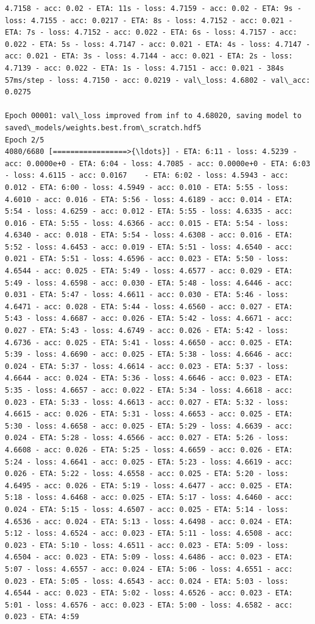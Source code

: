 \documentclass[11pt]{article}
\begin{document}
\begin{Verbatim}[commandchars=\\\{\}]
4.7158 - acc: 0.02 - ETA: 11s - loss: 4.7159 - acc: 0.02 - ETA: 9s - loss: 4.7155 - acc: 0.0217 - ETA: 8s - loss: 4.7152 - acc: 0.021 - ETA: 7s - loss: 4.7152 - acc: 0.022 - ETA: 6s - loss: 4.7157 - acc: 0.022 - ETA: 5s - loss: 4.7147 - acc: 0.021 - ETA: 4s - loss: 4.7147 - acc: 0.021 - ETA: 3s - loss: 4.7144 - acc: 0.021 - ETA: 2s - loss: 4.7139 - acc: 0.022 - ETA: 1s - loss: 4.7151 - acc: 0.021 - 384s 57ms/step - loss: 4.7150 - acc: 0.0219 - val\_loss: 4.6802 - val\_acc: 0.0275

Epoch 00001: val\_loss improved from inf to 4.68020, saving model to saved\_models/weights.best.from\_scratch.hdf5
Epoch 2/5
4080/6680 [=================>{\ldots}] - ETA: 6:11 - loss: 4.5239 - acc: 0.0000e+0 - ETA: 6:04 - loss: 4.7085 - acc: 0.0000e+0 - ETA: 6:03 - loss: 4.6115 - acc: 0.0167    - ETA: 6:02 - loss: 4.5943 - acc: 0.012 - ETA: 6:00 - loss: 4.5949 - acc: 0.010 - ETA: 5:55 - loss: 4.6010 - acc: 0.016 - ETA: 5:56 - loss: 4.6189 - acc: 0.014 - ETA: 5:54 - loss: 4.6259 - acc: 0.012 - ETA: 5:55 - loss: 4.6335 - acc: 0.016 - ETA: 5:55 - loss: 4.6366 - acc: 0.015 - ETA: 5:54 - loss: 4.6340 - acc: 0.018 - ETA: 5:54 - loss: 4.6308 - acc: 0.016 - ETA: 5:52 - loss: 4.6453 - acc: 0.019 - ETA: 5:51 - loss: 4.6540 - acc: 0.021 - ETA: 5:51 - loss: 4.6596 - acc: 0.023 - ETA: 5:50 - loss: 4.6544 - acc: 0.025 - ETA: 5:49 - loss: 4.6577 - acc: 0.029 - ETA: 5:49 - loss: 4.6598 - acc: 0.030 - ETA: 5:48 - loss: 4.6446 - acc: 0.031 - ETA: 5:47 - loss: 4.6611 - acc: 0.030 - ETA: 5:46 - loss: 4.6471 - acc: 0.028 - ETA: 5:44 - loss: 4.6560 - acc: 0.027 - ETA: 5:43 - loss: 4.6687 - acc: 0.026 - ETA: 5:42 - loss: 4.6671 - acc: 0.027 - ETA: 5:43 - loss: 4.6749 - acc: 0.026 - ETA: 5:42 - loss: 4.6736 - acc: 0.025 - ETA: 5:41 - loss: 4.6650 - acc: 0.025 - ETA: 5:39 - loss: 4.6690 - acc: 0.025 - ETA: 5:38 - loss: 4.6646 - acc: 0.024 - ETA: 5:37 - loss: 4.6614 - acc: 0.023 - ETA: 5:37 - loss: 4.6644 - acc: 0.024 - ETA: 5:36 - loss: 4.6646 - acc: 0.023 - ETA: 5:35 - loss: 4.6657 - acc: 0.022 - ETA: 5:34 - loss: 4.6618 - acc: 0.023 - ETA: 5:33 - loss: 4.6613 - acc: 0.027 - ETA: 5:32 - loss: 4.6615 - acc: 0.026 - ETA: 5:31 - loss: 4.6653 - acc: 0.025 - ETA: 5:30 - loss: 4.6658 - acc: 0.025 - ETA: 5:29 - loss: 4.6639 - acc: 0.024 - ETA: 5:28 - loss: 4.6566 - acc: 0.027 - ETA: 5:26 - loss: 4.6608 - acc: 0.026 - ETA: 5:25 - loss: 4.6659 - acc: 0.026 - ETA: 5:24 - loss: 4.6641 - acc: 0.025 - ETA: 5:23 - loss: 4.6619 - acc: 0.026 - ETA: 5:22 - loss: 4.6558 - acc: 0.025 - ETA: 5:20 - loss: 4.6495 - acc: 0.026 - ETA: 5:19 - loss: 4.6477 - acc: 0.025 - ETA: 5:18 - loss: 4.6468 - acc: 0.025 - ETA: 5:17 - loss: 4.6460 - acc: 0.024 - ETA: 5:15 - loss: 4.6507 - acc: 0.025 - ETA: 5:14 - loss: 4.6536 - acc: 0.024 - ETA: 5:13 - loss: 4.6498 - acc: 0.024 - ETA: 5:12 - loss: 4.6524 - acc: 0.023 - ETA: 5:11 - loss: 4.6508 - acc: 0.023 - ETA: 5:10 - loss: 4.6511 - acc: 0.023 - ETA: 5:09 - loss: 4.6504 - acc: 0.023 - ETA: 5:09 - loss: 4.6486 - acc: 0.023 - ETA: 5:07 - loss: 4.6557 - acc: 0.024 - ETA: 5:06 - loss: 4.6551 - acc: 0.023 - ETA: 5:05 - loss: 4.6543 - acc: 0.024 - ETA: 5:03 - loss: 4.6544 - acc: 0.023 - ETA: 5:02 - loss: 4.6526 - acc: 0.023 - ETA: 5:01 - loss: 4.6576 - acc: 0.023 - ETA: 5:00 - loss: 4.6582 - acc: 0.023 - ETA: 4:59 
\end{Verbatim}
\end{document}
